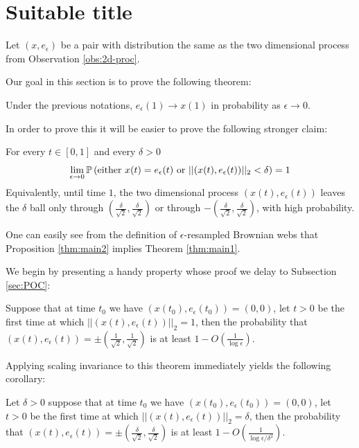 {
\newcommand{\eeps}{e_\epsilon}

\section{Suitable title}
Let $(x, \eeps)$ be a pair with distribution the same as the two
dimensional process from Observation \ref{obs:2d-proc}.

Our goal in this section is to prove the following theorem:
\begin{theorem}\label{thm:main1}
Under the previous notations, $\eeps(1) \to x(1)$ in probability
as $\epsilon \to 0$.
\end{theorem}

\newcommand{\radiussq}{\delta^2}
\newcommand{\radius}{\delta}
\newcommand{\twonorm}[1]{||#1||_2}

\newcommand{\twodproc}[1]{(x(#1), \eeps(#1))}

In order to prove this it will be easier to prove the following
stronger claim:
\begin{propos}\label{thm:main2}
For every $t\in[0,1]$ and every $\radius>0$
$$\ds \lim_{\epsilon \rightarrow 0}\P\left(\text{either } x(t)=\eeps(t)
\text{ or } \twonorm{\twodproc{t}} <\radius\right)=1$$
Equivalently, until time $1$, the two dimensional process $\twodproc{t}$
leaves the $\radius$ ball only through $(\frac{\radius}{\sqrt2},\frac{\radius}{\sqrt2})$ or through $-(\frac{\radius}{\sqrt2},\frac{\radius}{\sqrt2})$, with high probability.
\end{propos}

One can easily see from the definition of $\epsilon$-resampled
Brownian webs that Proposition \ref{thm:main2} implies Theorem
\ref{thm:main1}.

 We begin by presenting a handy property whose proof
we delay to Subsection \ref{sec:POC}:

\begin{propos}\label{thm:no-escape}
Suppose that at time $t_0$ we have
$\twodproc{t_0}=(0,0)$, let $t>0$ be the first time at which
$\twonorm{\twodproc{t}}=1$, then the probability
that $\twodproc{t} =\pm(\frac{1}{\sqrt2},\frac{1}{\sqrt2})$ is at least $1-O(\frac1{\log\epsilon})$.
\end{propos}

Applying scaling invariance to this theorem immediately yields the
following corollary:
\begin{cor}\label{cor:cor1}
Let $\radius>0$ suppose that at time $t_0$ we have $\twodproc{t_0}=(0,0)$, let
$t>0$ be the first time at which
$\twonorm{\twodproc{t}} = \radius$, then the probability
that $\twodproc{t} =\pm(\frac{\radius}{\sqrt2},\frac{\radius}{\sqrt2})$ is at least
$1-O(\frac{1}{\log\epsilon/\radiussq})$.
\end{cor}

}
